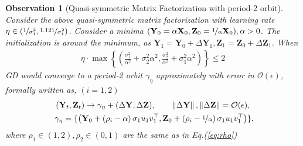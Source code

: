 \documentclass{article}
\theoremstyle{plain}
\newtheorem{obs}{Observation}
\theoremstyle{remark}
\newcommand{\norm}[1]{\left\lVert#1\right\rVert}
\def\O{\mathcal{O}}
\def\bX{\mathbf{X}}
\def\bY{\mathbf{Y}}
\def\bZ{\mathbf{Z}}
\begin{document}
\begin{obs}[Quasi-symmetric Matrix Factorization with period-2 orbit]
    \label{obs:quasi_mf}
    Consider the above quasi-symmetric matrix factorization with learning rate $\eta \in (\nicefrac{1}{\sigma_1^2}, \nicefrac{1.121}{\sigma_1^2})$. Consider a minima $(\bY_0=\alpha\bX_0, \bZ_0=\nicefrac{1}{\alpha}\mathbf{X}_0), \alpha>0$. The initialization is around the minimum, as $\mathbf{Y}_1 = \bY_0 +\Delta \mathbf{Y}_1, \mathbf{Z}_1 = \bZ_0 + \Delta \mathbf{Z}_1$. When
    \begin{align}
        \eta\cdot\max\left\{
        (\frac{\sigma_1^2}{\alpha^2}+\sigma_2^2\alpha^2, \frac{\sigma_2^2}{\alpha^2}+\sigma_1^2\alpha^2)
        \right\}
        \le 2
        \label{eq:quasi_sig2}
    \end{align}
    GD would converge to a period-2 orbit $\gamma_{\eta}$ approximately with error in $\O(\epsilon)$, formally written as, $(i=1,2)$ 
    \begin{gather*}
        (\mathbf{Y}_t, \mathbf{Z}_t) \rightarrow \gamma_{\eta} + (\Delta\mathbf{Y}, \Delta\mathbf{Z}), 
        ~~~~~~\norm{\Delta\mathbf{Y}}, \norm{\Delta\mathbf{Z}}=\O(\epsilon), \\\
        \gamma_{\eta} = \{\left(\mathbf{Y}_0 + \left(\rho_i-\alpha\right) \sigma_1 u_1 v_1^\top , \mathbf{Z}_0 + \left(\rho_i-\nicefrac{1}{\alpha}\right) \sigma_1 u_1 v_1^\top\right)\},
    \end{gather*}
    where $\rho_1\in (1,2),\rho_2\in(0,1)$ are the same as in Eq.(\ref{eq:rho})
\end{obs}
\end{document}
